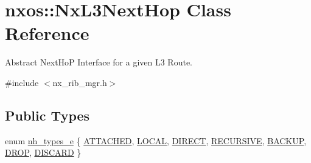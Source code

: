 \hypertarget{classnxos_1_1_nx_l3_next_hop}{}\section{nxos\+:\+:Nx\+L3\+Next\+Hop Class Reference}
\label{classnxos_1_1_nx_l3_next_hop}


Abstract Next\+HoP Interface for a given L3 Route.  




{\ttfamily \#include $<$nx\+\_\+rib\+\_\+mgr.\+h$>$}

\subsection*{Public Types}
\begin{DoxyCompactItemize}
\item 
enum \mbox{\hyperlink{classnxos_1_1_nx_l3_next_hop_ab58475e35a53b76cb9bdbfde04d537f3}{nh\+\_\+types\+\_\+e}} \{ \newline
\mbox{\hyperlink{classnxos_1_1_nx_l3_next_hop_ab58475e35a53b76cb9bdbfde04d537f3a912838c6148906933372bc719e6778b7}{A\+T\+T\+A\+C\+H\+ED}}, 
\mbox{\hyperlink{classnxos_1_1_nx_l3_next_hop_ab58475e35a53b76cb9bdbfde04d537f3ab073691a46b4482d1214e0da55f41587}{L\+O\+C\+AL}}, 
\mbox{\hyperlink{classnxos_1_1_nx_l3_next_hop_ab58475e35a53b76cb9bdbfde04d537f3a9259cb9dba5a62192e20458524d93bfa}{D\+I\+R\+E\+CT}}, 
\mbox{\hyperlink{classnxos_1_1_nx_l3_next_hop_ab58475e35a53b76cb9bdbfde04d537f3a6fb806fc312c9cc04dd11c1d0b772c2b}{R\+E\+C\+U\+R\+S\+I\+VE}}, 
\newline
\mbox{\hyperlink{classnxos_1_1_nx_l3_next_hop_ab58475e35a53b76cb9bdbfde04d537f3ae078b4acb489b4d29214764fe732bd5e}{B\+A\+C\+K\+UP}}, 
\mbox{\hyperlink{classnxos_1_1_nx_l3_next_hop_ab58475e35a53b76cb9bdbfde04d537f3af0d20d4eed57271845ddcb39a2451ce5}{D\+R\+OP}}, 
\mbox{\hyperlink{classnxos_1_1_nx_l3_next_hop_ab58475e35a53b76cb9bdbfde04d537f3a71e4b55f7ef95579440ef91cc247c2c7}{D\+I\+S\+C\+A\+RD}}
 \}
\end{DoxyCompactItemize}
